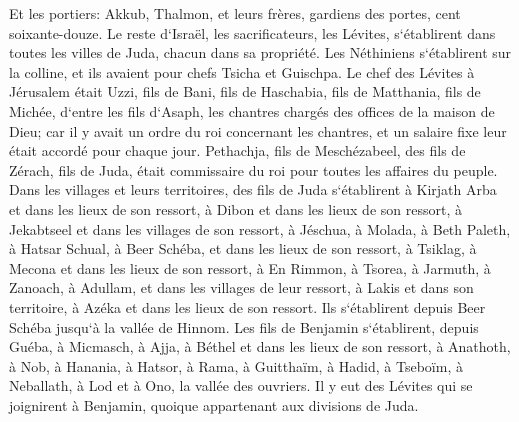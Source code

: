 \verse Et les portiers: Akkub, Thalmon, et leurs frères, gardiens des portes, cent soixante-douze. 
\verse Le reste d`Israël, les sacrificateurs, les Lévites, s`établirent dans toutes les villes de Juda, chacun dans sa propriété. 
\verse Les Néthiniens s`établirent sur la colline, et ils avaient pour chefs Tsicha et Guischpa. 
\verse Le chef des Lévites à Jérusalem était Uzzi, fils de Bani, fils de Haschabia, fils de Matthania, fils de Michée, d`entre les fils d`Asaph, les chantres chargés des offices de la maison de Dieu; 
\verse car il y avait un ordre du roi concernant les chantres, et un salaire fixe leur était accordé pour chaque jour. 
\verse Pethachja, fils de Meschézabeel, des fils de Zérach, fils de Juda, était commissaire du roi pour toutes les affaires du peuple. 
\verse Dans les villages et leurs territoires, des fils de Juda s`établirent à Kirjath Arba et dans les lieux de son ressort, à Dibon et dans les lieux de son ressort, à Jekabtseel et dans les villages de son ressort, 
\verse à Jéschua, à Molada, à Beth Paleth, 
\verse à Hatsar Schual, à Beer Schéba, et dans les lieux de son ressort, 
\verse à Tsiklag, à Mecona et dans les lieux de son ressort, 
\verse à En Rimmon, à Tsorea, à Jarmuth, 
\verse à Zanoach, à Adullam, et dans les villages de leur ressort, à Lakis et dans son territoire, à Azéka et dans les lieux de son ressort. Ils s`établirent depuis Beer Schéba jusqu`à la vallée de Hinnom. 
\verse Les fils de Benjamin s`établirent, depuis Guéba, à Micmasch, à Ajja, à Béthel et dans les lieux de son ressort, 
\verse à Anathoth, à Nob, à Hanania, 
\verse à Hatsor, à Rama, à Guitthaïm, 
\verse à Hadid, à Tseboïm, à Neballath, 
\verse à Lod et à Ono, la vallée des ouvriers. 
\verse Il y eut des Lévites qui se joignirent à Benjamin, quoique appartenant aux divisions de Juda. 


